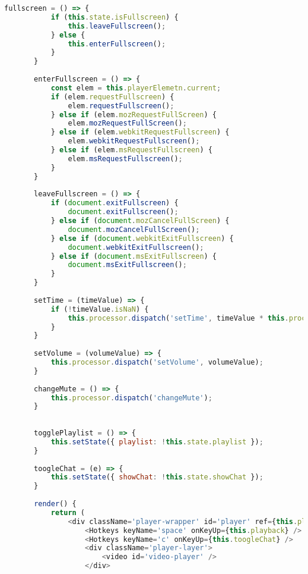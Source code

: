 \begin{lstlisting}[language=JavaScript,label={lst:add:player}]
       fullscreen = () => {
           if (this.state.isFullscreen) {
               this.leaveFullscreen();
           } else {
               this.enterFullscreen();
           }
       }
     
       enterFullscreen = () => {
           const elem = this.playerElemetn.current;
           if (elem.requestFullscreen) {
               elem.requestFullscreen();
           } else if (elem.mozRequestFullScreen) {
               elem.mozRequestFullScreen();
           } else if (elem.webkitRequestFullscreen) {
               elem.webkitRequestFullscreen();
           } else if (elem.msRequestFullscreen) {
               elem.msRequestFullscreen();
           }
       }
     
       leaveFullscreen = () => {
           if (document.exitFullscreen) {
               document.exitFullscreen();
           } else if (document.mozCancelFullScreen) {
               document.mozCancelFullScreen();
           } else if (document.webkitExitFullscreen) {
               document.webkitExitFullscreen();
           } else if (document.msExitFullscreen) {
               document.msExitFullscreen();
           }
       }
     
       setTime = (timeValue) => {
           if (!timeValue.isNaN) {
               this.processor.dispatch('setTime', timeValue * this.processor.duration);
           }
       }
     
       setVolume = (volumeValue) => {
           this.processor.dispatch('setVolume', volumeValue);
       }
     
       changeMute = () => {
           this.processor.dispatch('changeMute');
       }
     
     
       togglePlaylist = () => {
           this.setState({ playlist: !this.state.playlist });
       }
     
       toogleChat = (e) => {
           this.setState({ showChat: !this.state.showChat });
       }
     
       render() {
           return (
               <div className='player-wrapper' id='player' ref={this.playerElemetn}>
                   <Hotkeys keyName='space' onKeyUp={this.playback} />
                   <Hotkeys keyName='c' onKeyUp={this.toogleChat} />
                   <div className='player-layer'>
                       <video id='video-player' />
                   </div>
     

\end{lstlisting}
